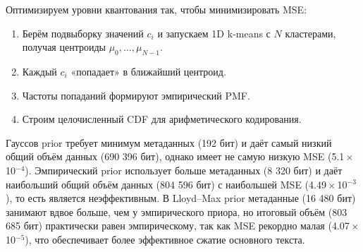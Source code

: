 \documentclass[a4paper,11pt]{article}
\begin{document}
Оптимизируем уровни квантования так, чтобы минимизировать MSE:
\begin{enumerate}
  \item Берём подвыборку значений $c_i$ и запускаем 1D k‑means с $N$ кластерами, получая центроиды $\mu_0,\dots,\mu_{N-1}$.
  \item Каждый $c_i$ «попадает» в ближайший центроид.
  \item Частоты попаданий формируют эмпирический PMF.
  \item Строим целочисленный CDF для арифметического кодирования.
\end{enumerate}

\begin{table}[ht]
\centering
{}
\caption{Сравнение hyper‑prior по объёму данных, метаданным и качеству восстановления}
\end{table}

Гауссов prior требует минимум метаданных (192 бит) и даёт самый низкий общий объём данных (690 396 бит), однако имеет не самую низкую MSE (5.1\,$\times$\,10$^{-4}$). 
Эмпирический prior использует больше метаданных (8 320 бит) и даёт наибольший общий объём данных (804 596 бит) с наибольшей MSE (4.49\,$\times$\,10$^{-3}$), то есть является неэффективным. 
В Lloyd–Max prior метаданные (16 480 бит) занимают вдвое больше, чем у эмпирического приора, но итоговый объём (803 685 бит) практически равен эмпирическому, так как MSE рекордно малая (4.07\,$\times$\,10$^{-5}$), что обеспечивает более эффективное сжатие основного текста.
\end{document}
